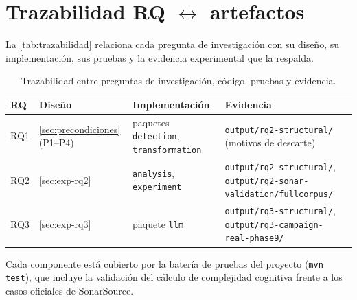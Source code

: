 \chapter{Trazabilidad RQ $\leftrightarrow$ artefactos}
\label{ap:trazabilidad}
La \autoref{tab:trazabilidad} relaciona cada pregunta de investigación con su
diseño, su implementación, sus pruebas y la evidencia experimental que la
respalda.

\begin{table}[ht]
\centering
\caption{Trazabilidad entre preguntas de investigación, código, pruebas y
evidencia.}
\label{tab:trazabilidad}
\begin{tabularx}{\linewidth}{@{}l>{\raggedright\arraybackslash}X>{\raggedright\arraybackslash}X>{\raggedright\arraybackslash}X@{}}
\toprule
\textbf{RQ} & \textbf{Diseño} & \textbf{Implementación} & \textbf{Evidencia} \\
\midrule
RQ1 & \autoref{sec:precondiciones} (P1--P4) & paquetes \texttt{detection}, \texttt{transformation} & \texttt{output/\allowbreak rq2-structural/} (motivos de descarte) \\
RQ2 & \autoref{sec:exp-rq2} & \texttt{analysis}, \texttt{experiment} & \texttt{output/\allowbreak rq2-structural/}, \texttt{output/\allowbreak rq2-sonar-validation/\allowbreak fullcorpus/} \\
RQ3 & \autoref{sec:exp-rq3} & paquete \texttt{llm} & \texttt{output/\allowbreak rq3-structural/}, \texttt{output/\allowbreak rq3-campaign-real-phase9/} \\
\bottomrule
\end{tabularx}
\end{table}

Cada componente está cubierto por la batería de pruebas del proyecto
(\texttt{mvn test}), que incluye la validación del cálculo de complejidad
cognitiva frente a los casos oficiales de SonarSource.


